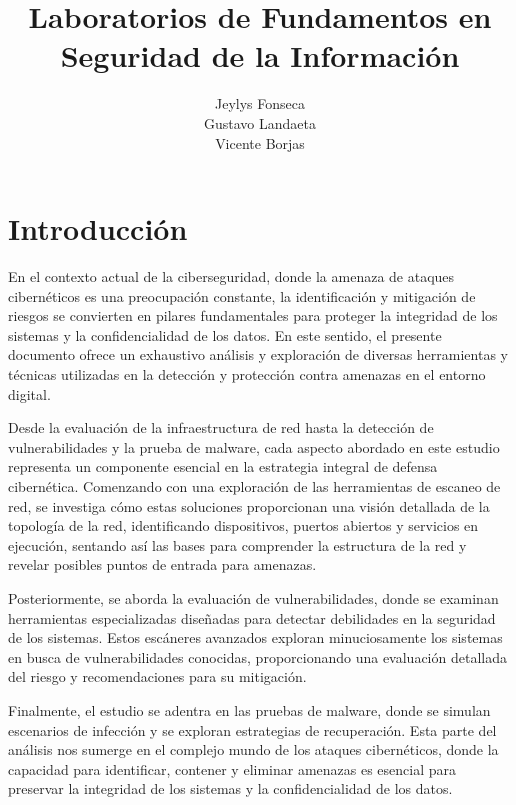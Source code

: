 \documentclass[stu, 11pt, letterpaper, donotrepeattitle, floatsintext, natbib]{apa7}
\title{\Large Laboratorios de Fundamentos en Seguridad de la Información}
\author{Jeylys Fonseca \\Gustavo Landaeta \\Vicente Borjas} %
\begin{document}
\maketitle


\renewcommand\contentsname{\largeÍndice}
\setcounter{tocdepth}{2}
\newpage
\renewcommand{\listfigurename}{\largeÍndice de fíguras}
\newpage
\renewcommand{\listtablename}{\largeÍndice de tablas}
\newpage


\section{\large Introducción}

En el contexto actual de la ciberseguridad, donde la amenaza de ataques cibernéticos es una preocupación constante, la identificación y mitigación de riesgos se convierten en pilares fundamentales para proteger la integridad de los sistemas y la confidencialidad de los datos. En este sentido, el presente documento ofrece un exhaustivo análisis y exploración de diversas herramientas y técnicas utilizadas en la detección y protección contra amenazas en el entorno digital.

Desde la evaluación de la infraestructura de red hasta la detección de vulnerabilidades y la prueba de malware, cada aspecto abordado en este estudio representa un componente esencial en la estrategia integral de defensa cibernética. Comenzando con una exploración de las herramientas de escaneo de red, se investiga cómo estas soluciones proporcionan una visión detallada de la topología de la red, identificando dispositivos, puertos abiertos y servicios en ejecución, sentando así las bases para comprender la estructura de la red y revelar posibles puntos de entrada para amenazas.

Posteriormente, se aborda la evaluación de vulnerabilidades, donde se examinan herramientas especializadas diseñadas para detectar debilidades en la seguridad de los sistemas. Estos escáneres avanzados exploran minuciosamente los sistemas en busca de vulnerabilidades conocidas, proporcionando una evaluación detallada del riesgo y recomendaciones para su mitigación.

Finalmente, el estudio se adentra en las pruebas de malware, donde se simulan escenarios de infección y se exploran estrategias de recuperación. Esta parte del análisis nos sumerge en el complejo mundo de los ataques cibernéticos, donde la capacidad para identificar, contener y eliminar amenazas es esencial para preservar la integridad de los sistemas y la confidencialidad de los datos.
\end{document}
